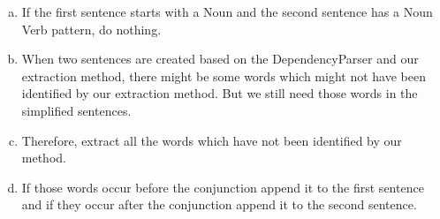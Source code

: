 \documentclass[a4paper,11pt]{article}
\begin{document}
\begin{enumerate}[(a)]
\item If the first sentence starts with a Noun and the second sentence has a Noun Verb pattern, do nothing.
\item When two sentences are created based on the DependencyParser and our extraction method, there might be some words which might not have been identified by our extraction method. But we still need those words in the simplified sentences.
\item Therefore, extract all the words which have not been identified by our method.
\item If those words occur before the conjunction append it to the first sentence and if they occur after the conjunction append it to the second sentence.

\end{enumerate}
\end{document}
